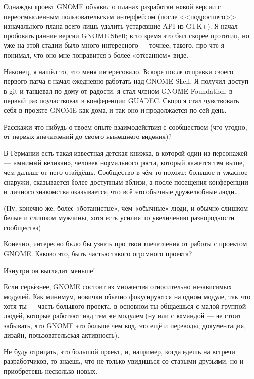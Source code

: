 \documentclass[10pt, a5paper]{article}
\begin{document}
\begin{Parallel}[p]{}{}
{Однажды проект GNOME объявил о планах разработки новой версии с переосмысленным пользовательским интерфейсом (после <<подросшего>> изначального плана всего лишь удалить устаревшие API из GTK+). Я начал пробовать ранние версии GNOME Shell; в то время это был скорее прототип, но уже на этой стадии было много интересного — точнее, такого, про что я понимал, что оно мне понравится в более «отёсанном» виде.

Наконец, я нашёл то, что меня интересовало. Вскоре после отправки своего первого патча я начал ежедневно работать над \linebreak GNOME Shell. Я получил доступ в git и танцевал по дому от радости, я стал членом GNOME Foundation, в первый раз поучаствовал в конференции GUADEC. Скоро я стал чувствовать себя в проекте GNOME как дома, и так оно и продолжается по сей день.

\q Расскажи что-нибудь о твоем опыте взаимодействия с сообществом (что угодно, от первых впечатлений до своего нынешнего видения)?

\a В Германии есть такая известная детская книжка, в которой один из персонажей — «мнимый великан», человек нормального роста, который кажется тем выше, чем дальше от него отойдёшь. Сообщество в чём-то похоже: большое и ужасное снаружи, оказывается более доступным вблизи, а после посещения конференции и личного знакомства оказывается, что всё это обычные дружелюбные люди…

(Ну, конечно же, более «ботанистые», чем «обычные» люди, и обычно слишком белые и слишком мужчины, хотя есть усилия по увеличению разнородности сообщества\fakefootnote{})

\q Конечно, интересно было бы узнать про твои впечатления от работы с проектом GNOME. Каково это, быть частью такого огромного проекта?

\a Изнутри он выглядит меньше!

Если серьёзнее, GNOME состоит из множества относительно независимых модулей. Как минимум, новички обычно фокусируются на одном модуле, так что хотя ты — часть большого проекта, в основном ты общаешься с малой группой людей, которые работают над тем же модулем (ну или с командой --- не стоит забывать, что GNOME это больше чем код, это ещё и переводы, документация, дизайн, пользовательская активность).

Не буду отрицать, это большой проект, и, например, когда едешь на встречи разработчиков, то знаешь, что не только увидишься со старыми друзьями, но и приобретешь несколько новых.

}
\end{Parallel}
\end{document}

